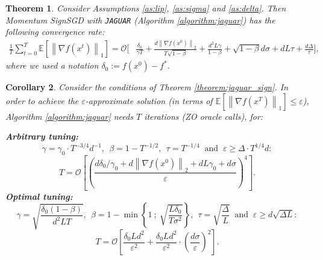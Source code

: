 \documentclass{article}
\theoremstyle{plain}
\newtheorem{theorem}{Theorem}[section]
\newtheorem{corollary}[theorem]{Corollary}
\theoremstyle{definition}
\theoremstyle{remark}
\newcommand{\expect}[1]{\mathbb{E}\left[ #1 \right]}
\newcommand{\norm}[1]{\left\| #1 \right\|}
\begin{document}
\begin{theorem}
    \label{theorem:jaguar_muon}
    Consider Assumptions \ref{as:lip}, \ref{as:sigma} and \ref{as:delta}. Then Momentum SignSGD with \texttt{JAGUAR} (Algorithm \ref{algorithm:jaguar}) has the following convergence rate:
        \begin{equation*}
        \begin{split}
            \frac{1}{T} \sum_{t=0}^T \expect{\norm{\nabla f(x^t)}_1}
            =
            \mathcal{O} \Bigg[ 
                &\frac{\delta_0}{\gamma T}
                +
                \frac{d \norm{\nabla f(x^0)}_2}{T \sqrt{1 - \beta}}
                +
                \frac{d^2 L \gamma}{1-\beta}  
                +
                \sqrt{1-\beta}d \sigma
                +
                d L \tau
                +
                \frac{d \Delta}{\tau} 
            \Bigg],
        \end{split}
        \end{equation*}
        where we used a notation $\delta_0 := f(x^0) - f^*$. 
\end{theorem}

\begin{corollary}
    Consider the conditions of Theorem \ref{theorem:jaguar_sign}. In order to achieve the $\varepsilon$-approximate solution (in terms of $\expect{\norm{\nabla f(x^T)}_1} \leq \varepsilon$), Algorithm \ref{algorithm:jaguar} needs $T$ iterations (ZO oracle calls), for:

    \textbf{Arbitrary tuning:}
    $$
        \gamma = \gamma_0 \cdot T^{-3/4} d^{-1}, 
        ~~ \beta = 1 - T^{-1/2},
        ~~ \tau = T^{-1/4}
        ~\text{ and }~
        \varepsilon \geq \Delta \cdot T^{1/4} d:
    $$
    \begin{equation*}
        T = \mathcal{O} \left[ \left( \frac{d \delta_0 / \gamma_0 + d \norm{\nabla f(x^0)}_2 + d L \gamma_0 + d \sigma }{\varepsilon} \right)^4\right] .
    \end{equation*}
    \textbf{Optimal tuning:}
    $$
        \gamma = \sqrt{\frac{\delta_0 (1 - \beta)}{d^2 L T}}, 
        ~~ \beta = 1 - \min\left\{1 ~;~ \sqrt{\frac{L \delta_0}{T \sigma^2}}\right\},
        ~~ \tau = \sqrt{\frac{\Delta}{L}}
        ~\text{ and }~
        \varepsilon \geq d \sqrt{\Delta L}:
    $$
    \begin{equation*}
        T = \mathcal{O} \left[ \frac{\delta_0 L d^2}{\varepsilon^2} + \frac{\delta_0 L d^2}{\varepsilon^2} \cdot \left( \frac{d \sigma}{\varepsilon} \right)^2\right] .
    \end{equation*}
\end{corollary}
\end{document}
